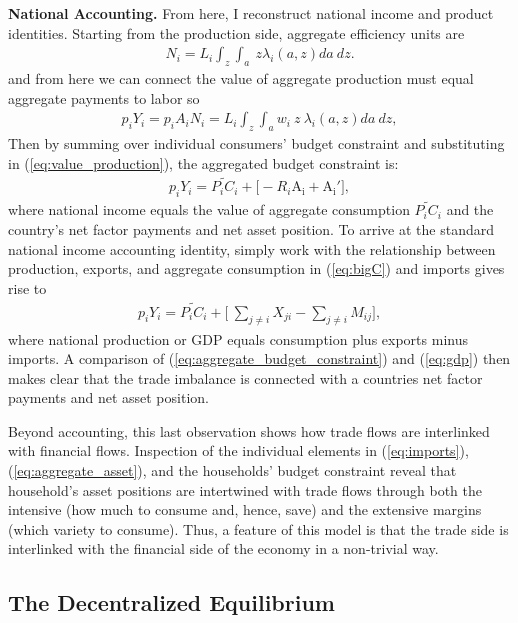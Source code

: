 \documentclass[12pt,pdftex]{article}
\begin{document}
\begin{onehalfspacing}
\textbf{National Accounting.} From here, I reconstruct national income and product identities. Starting from the production side, aggregate efficiency units are
\begin{align}
N_i = L_{i}\int_{z} \int_{a}\ z \lambda_i(a, z) da \ dz. \label{eq:ag-labor-supply}
\end{align}
and from here we can connect the value of aggregate production must equal aggregate payments to labor so
\begin{align}
p_{i} Y_{i} = p_{i} A_{i} N_{i} = L_i \int_{z} \int_{a} w_{i} \ z \ \lambda_i(a, z) da \ dz,
\label{eq:value_production}
\end{align}
Then by summing over individual consumers' budget constraint and substituting in (\ref{eq:value_production}), the aggregated budget constraint is:
\begin{align}
p_{i} Y_{i}  = \widetilde{P_{i} C_i}  + \bigg[-R_i\mathrm{A_i} +  \mathrm{A_i'} \bigg],
\label{eq:aggregate_budget_constraint}
\end{align}
where national income equals the value of aggregate consumption $\widetilde{P_{i} C_i}$ and the country's net factor payments and net asset position. To arrive at the standard national income accounting identity, simply work with the relationship between production, exports, and aggregate consumption in (\ref{eq:bigC}) and imports gives rise to
\begin{align}
p_{i} Y_{i}  = \widetilde{P_{i} C_i} + \bigg[\ \sum_{j\neq i}X_{ji} -  \sum_{j\neq i}M_{ij} \bigg],
\label{eq:gdp}
\end{align}
where national production or GDP equals consumption plus exports minus imports. A comparison of (\ref{eq:aggregate_budget_constraint}) and (\ref{eq:gdp}) then makes clear that the trade imbalance is connected with a countries net factor payments and net asset position.

Beyond accounting, this last observation shows how trade flows are interlinked with financial flows. Inspection of the individual elements in (\ref{eq:imports}), (\ref{eq:aggregate_asset}), and the households' budget constraint reveal that household's asset positions are intertwined with trade flows through both the intensive (how much to consume and, hence, save) and the extensive margins (which variety to consume). Thus, a feature of this model is that the trade side is interlinked with the financial side of the economy in a non-trivial way.

\subsection{The Decentralized Equilibrium}


\end{onehalfspacing}
\end{document}
